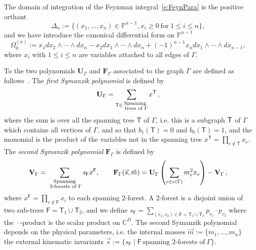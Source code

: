 \documentclass[a4paper,12pt]{article}
\numberwithin{equation}{section}
\numberwithin{figure}{section}
\begin{document}
The domain of integration of the Feynman integral~\eqref{e:FeynPara}  is the positive orthant
\begin{equation}\label{e:Deltan}
  \Delta_n:=\{(x_1,\dots,x_n)\in \mathbb P^{n-1}, x_i \geq0 ~\textrm{for}~ 1\leq
            i\leq n\},
          \end{equation}
          and we have introduce the canonical differential form on
          $\mathbb P^{n-1}$ 
\begin{equation}
 \Omega_0^{(n)}:=   x_1 dx_2\wedge \cdots \wedge dx_n- x_2
                dx_1\wedge\cdots \wedge dx_n+(-1)^{n-1}  x_n dx_1\wedge \cdots \wedge dx_{n-1}  ,
              \end{equation}
where $x_i$ with $1\leq i\leq n$  are  variables attached to all edges of
$\Gamma$.

To the two polynomials $\textbf{U}_\Gamma$ and $\textbf{F}_\Gamma$
associated to the graph $\Gamma$ are defined as
follows~\cite{nakanishi1971graph,Weinzierl:2022eaz}.  The {\em first
  Symanzik polynomial} is defined by
\begin{equation}\label{e:Udef}
{\bf U}_\Gamma = \sum_{\mathsf{T} \in \substack{ \text{Spanning} \\ \text{ trees of } \Gamma}} x^{\mathsf{T}}\,, 
\end{equation}
where the sum is over all the spanning tree $\mathsf{T}$ of $\Gamma$,
i.e.  this is a subgraph ${\sf T}$ of $\Gamma$ which contains all
vertices of $\Gamma$, and so that $b_1(\mathsf{T}) =0$ and
$b_0(\mathsf{T})=1$, and the
monomial is the product of the variables not in the spanning tree
$x^{\mathsf{T}} = \prod_{e\notin {\mathsf{T}}} x_e$. 
The {\em second 
  Symanzik polynomial}  $\textbf{F}_\Gamma$ is defined by
\begin{equation}\label{e:VFdef}
{\bf V}_{\Gamma} = \sum_{\substack{ \text{Spanning} \\ \text{ 2-forests
      of } \Gamma}}s_{\mathsf{F}} x^{\mathsf{F}}  ,\qquad {\bf F}_{\Gamma}(\vec{s}, \vec{m}) = {\bf U}_\Gamma\left( \sum_{e \in e(\Gamma)} m_e^2 x_e\right) - {\bf V}_{\Gamma}\,,
\end{equation}
where $x^{\mathsf{F}} =
\prod_{e \notin \mathsf{F}} x_i$ to each spanning 2-forest. A 2-forest
is a disjoint union of two sub-trees $\mathsf{F}=\mathsf{T}_1\cup \mathsf{T}_2$,  and we define $s_\mathsf{F} = \sum_{(v_1,v_2) \in \mathsf{F}=\mathsf{T}_1\cup \mathsf{T}_2} p_{v_1}\cdot p_{v_2}$ where the ${}\cdot{}$-product is the
scalar product on $\mathbb {C}^{D}$.
The second Symanzik polynomial depends on the physical parameters,
i.e. the
internal masses $\vec m:=\{m_1,\dots,m_n\}$ the external kinematic invariants
$\vec s:=\{s_\textsf{F} \mid \textsf{F} ~ \textrm{spanning
2-forests of}~\Gamma\}$.
\end{document}
